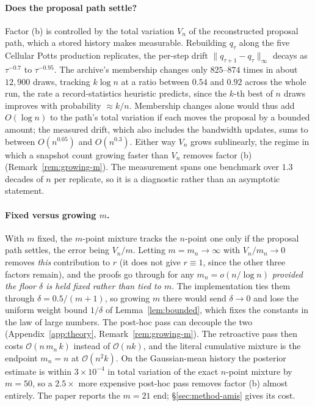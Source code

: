 \documentclass[10pt]{article}
\theoremstyle{plain}
\theoremstyle{definition}
\begin{document}
\paragraph{Does the proposal path settle?} Factor (b) is controlled by the total variation $V_n$ of the reconstructed proposal path, which a stored history makes measurable. Rebuilding $q_\tau$ along the five Cellular Potts production replicates, the per-step drift $\|q_{\tau+1}-q_\tau\|_\infty$ decays as $\tau^{-0.7}$ to $\tau^{-0.95}$. The archive's membership changes only $825$--$874$ times in about $12{,}900$ draws, tracking $k\log n$ at a ratio between $0.54$ and $0.92$ across the whole run, the rate a record-statistics heuristic predicts, since the $k$-th best of $n$ draws improves with probability ${\approx}k/n$. Membership changes alone would thus add $O(\log n)$ to the path's total variation if each moves the proposal by a bounded amount; the measured drift, which also includes the bandwidth updates, sums to between $O(n^{0.05})$ and $O(n^{0.3})$. Either way $V_n$ grows sublinearly, the regime in which a snapshot count growing faster than $V_n$ removes factor (b) (Remark~\ref{rem:growing-m}). The measurement spans one benchmark over $1.3$ decades of $n$ per replicate, so it is a diagnostic rather than an asymptotic statement.

\paragraph{Fixed versus growing $m$.} With $m$ fixed, the $m$-point mixture tracks the $n$-point one only if the proposal path settles, the error being $V_n/m$. Letting $m=m_n\to\infty$ with $V_n/m_n\to0$ removes \emph{this} contribution to $r$ (it does not give $r\equiv1$, since the other three factors remain), and the proofs go through for any $m_n=o(n/\log n)$ \emph{provided the floor $\delta$ is held fixed rather than tied to $m$}. The implementation ties them through $\delta=0.5/(m{+}1)$, so growing $m$ there would send $\delta\to0$ and lose the uniform weight bound $1/\delta$ of Lemma~\ref{lem:bounded}, which fixes the constants in the law of large numbers. The post-hoc pass can decouple the two (Appendix~\ref{app:theory}, Remark~\ref{rem:growing-m}). The retroactive pass then costs $\mathcal{O}(n\,m_n\,k)$ instead of $\mathcal{O}(nk)$, and the literal cumulative mixture is the endpoint $m_n=n$ at $\mathcal{O}(n^2k)$. On the Gaussian-mean history the posterior estimate is within $3\times10^{-4}$ in total variation of the exact $n$-point mixture by $m=50$, so a $2.5\times$ more expensive post-hoc pass removes factor (b) almost entirely. The paper reports the $m=21$ end; \S\ref{sec:method-amis} gives its cost.
\end{document}
